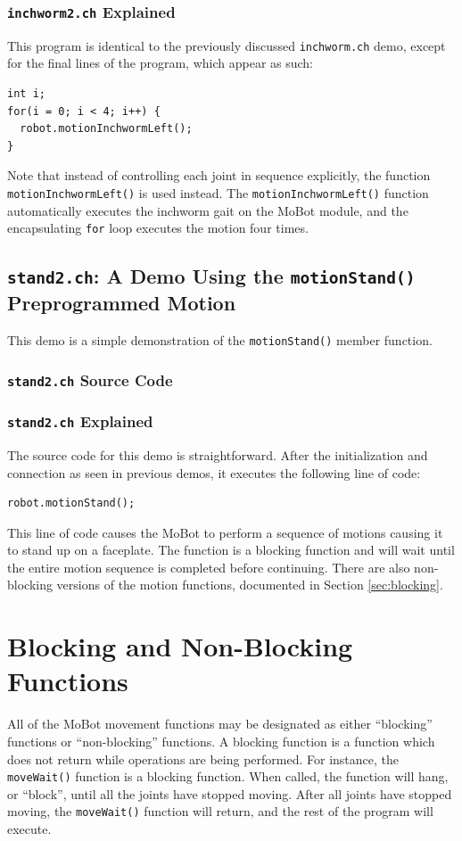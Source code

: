 \documentclass{article}
\begin{document}
\subsubsection{\texttt{inchworm2.ch} Explained}
This program is identical to the previously discussed \texttt{inchworm.ch} demo,
except for the final lines of the program, which appear as such:
\begin{verbatim}
int i;
for(i = 0; i < 4; i++) {
  robot.motionInchwormLeft();
}
\end{verbatim}
Note that instead of controlling each joint in sequence explicitly, the function
\texttt{motionInchwormLeft()} is used instead. The \texttt{motionInchwormLeft()} 
function automatically executes the inchworm gait on the MoBot module, and the
encapsulating \texttt{for} loop executes the motion four times.

\subsection{\texttt{stand2.ch}: A Demo Using the \texttt{motionStand()} Preprogrammed
Motion}
This demo is a simple demonstration of the \texttt{motionStand()} member function.
\subsubsection{\texttt{stand2.ch} Source Code}

\subsubsection{\texttt{stand2.ch} Explained}
The source code for this demo is straightforward. After the initialization and 
connection as seen in previous demos, it executes the following line of
code:
\begin{verbatim}
robot.motionStand();
\end{verbatim}
This line of code causes the MoBot to perform a sequence of motions causing it to
stand up on a faceplate. The function is a blocking function and will wait until
the entire motion sequence is completed before continuing. There are also non-blocking
versions of the motion functions, documented in Section \ref{sec:blocking}.

\section{\label{sec:blocking}Blocking and Non-Blocking Functions}
All of the MoBot movement functions may be designated as either ``blocking'' 
functions or ``non-blocking'' functions. A blocking function is a function which
does not return while operations are being performed. For instance, the
\texttt{moveWait()} function is a blocking function. When called, the function
will hang, or ``block'', until all the joints have stopped moving. After all
joints have stopped moving, the \texttt{moveWait()} function will return, and 
the rest of the program will execute.
\end{document}
